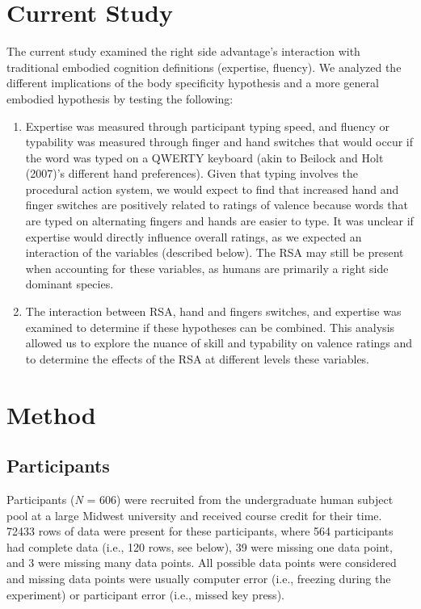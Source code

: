 \documentclass[english,man]{apa6}
\providecommand{\tightlist}{%
  \setlength{\itemsep}{0pt}\setlength{\parskip}{0pt}}
\theoremstyle{definition}
\theoremstyle{definition}
\theoremstyle{definition}
\theoremstyle{remark}
\begin{document}
\section{Current Study}\label{current-study}

The current study examined the right side advantage's interaction with
traditional embodied cognition definitions (expertise, fluency). We
analyzed the different implications of the body specificity hypothesis
and a more general embodied hypothesis by testing the following:

\begin{enumerate}
\def\labelenumi{\arabic{enumi})}
\tightlist
\item
  Expertise was measured through participant typing speed, and fluency
  or typability was measured through finger and hand switches that would
  occur if the word was typed on a QWERTY keyboard (akin to Beilock and
  Holt (2007)'s different hand preferences). Given that typing involves
  the procedural action system, we would expect to find that increased
  hand and finger switches are positively related to ratings of valence
  because words that are typed on alternating fingers and hands are
  easier to type. It was unclear if expertise would directly influence
  overall ratings, as we expected an interaction of the variables
  (described below). The RSA may still be present when accounting for
  these variables, as humans are primarily a right side dominant
  species.
\item
  The interaction between RSA, hand and fingers switches, and expertise
  was examined to determine if these hypotheses can be combined. This
  analysis allowed us to explore the nuance of skill and typability on
  valence ratings and to determine the effects of the RSA at different
  levels these variables.
\end{enumerate}

\section{Method}\label{method}

\subsection{Participants}\label{participants}

Participants (\emph{N} = 606) were recruited from the undergraduate
human subject pool at a large Midwest university and received course
credit for their time. 72433 rows of data were present for these
participants, where 564 participants had complete data (i.e., 120 rows,
see below), 39 were missing one data point, and 3 were missing many data
points. All possible data points were considered and missing data points
were usually computer error (i.e., freezing during the experiment) or
participant error (i.e., missed key press).
\end{document}
